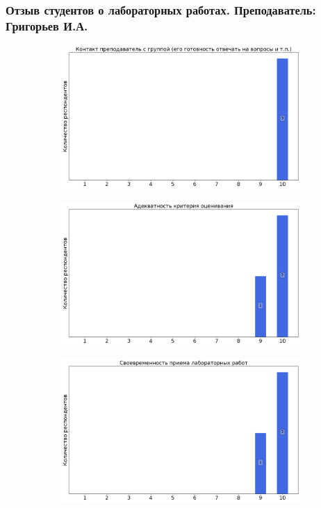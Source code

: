     \subsubsection{Отзыв студентов о лабораторных работах. Преподаватель: Григорьев И.А.}
		\begin{figure}[H]
			\centering
			\begin{subfigure}[b]{0.45\textwidth}
				\centering
				\includegraphics[width=\textwidth]{images/3 course/Аналоговая электроника/labniks-marks-Григорьев И.А.-0.png}
			\end{subfigure}
			\begin{subfigure}[b]{0.45\textwidth}
				\centering
				\includegraphics[width=\textwidth]{images/3 course/Аналоговая электроника/labniks-marks-Григорьев И.А.-1.png}
			\end{subfigure}
			\begin{subfigure}[b]{0.45\textwidth}
				\centering
				\includegraphics[width=\textwidth]{images/3 course/Аналоговая электроника/labniks-marks-Григорьев И.А.-2.png}

\end{subfigure}
\end{figure}
